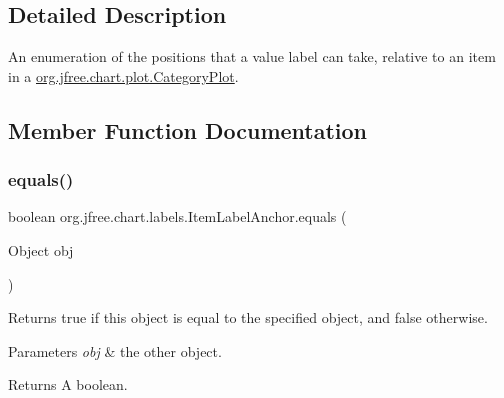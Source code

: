 \subsection{Detailed Description}
An enumeration of the positions that a value label can take, relative to an item in a \mbox{\hyperlink{classorg_1_1jfree_1_1chart_1_1plot_1_1_category_plot}{org.\+jfree.\+chart.\+plot.\+Category\+Plot}}. 

\subsection{Member Function Documentation}
\mbox{\label{classorg_1_1jfree_1_1chart_1_1labels_1_1_item_label_anchor_ac436b669ebf75b3065916161dcee6489}} 
\subsubsection{\texorpdfstring{equals()}{equals()}}
{\footnotesize\ttfamily boolean org.\+jfree.\+chart.\+labels.\+Item\+Label\+Anchor.\+equals (\begin{DoxyParamCaption}\item[{Object}]{obj }\end{DoxyParamCaption})}

Returns {\ttfamily true} if this object is equal to the specified object, and {\ttfamily false} otherwise.


\begin{DoxyParams}{Parameters}
{\em obj} & the other object.\\
\hline
\end{DoxyParams}
\begin{DoxyReturn}{Returns}
A boolean. 
\end{DoxyReturn}
\mbox{\label{classorg_1_1jfree_1_1chart_1_1labels_1_1_item_label_anchor_a82c2ba8072f6d297362787ba0d48e66e}} 
